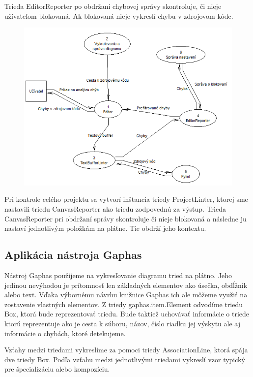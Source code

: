 \documentclass[11pt,oneside,final]{fithesis2}
\begin{document}
		Trieda EditorReporter po obdržaní chybovej správy skontroluje, či nieje užívateľom blokovaná. Ak blokovaná nieje vykreslí chybu v zdrojovom kóde.

	
	\begin{figure}[htb]
	 \centering
	 \includegraphics[width=\textwidth]{images/dfd_editor}
	\end{figure}

		
	Pri kontrole celého projektu sa vytvorí inštancia triedy ProjectLinter, ktorej sme nastavili triedu CanvasReporter ako triedu zodpovednú za výstup. Trieda CanvasReporter pri obdržaní správy 
 skontroluje či nieje blokovaná a následne ju nastaví jednotlivým položkám na plátne. Tie obdrží jeho kontextu.
 
		\subsection{Aplikácia nástroja Gaphas}
		
		Nástroj Gaphas použijeme na vykresľovanie diagramu tried na plátno. Jeho jedinou nevýhodou je prítomnosť len základných elementov ako úsečka, obdĺžnik alebo text. Vďaka výbornému návrhu knižnice Gaphas ich ale môžeme využiť na zostavenie vlastných elementov. Z triedy gaphas.item.Element odvodíme triedu Box, ktorá bude reprezentovať triedu. Bude taktiež uchovávať informácie o triede ktorú reprezentuje ako je cesta k súboru, názov, číslo riadku jej výskytu ale aj informácie o chybách, ktoré detekujeme.
		
		Vzťahy medzi triedami vykreslíme za pomoci triedy AssociationLine, ktorá spája dve triedy Box. Podľa vzťahu medzi jednotlivými triedami vykreslí vzor typický pre špecializáciu alebo kompozíciu.
		
\end{document}
